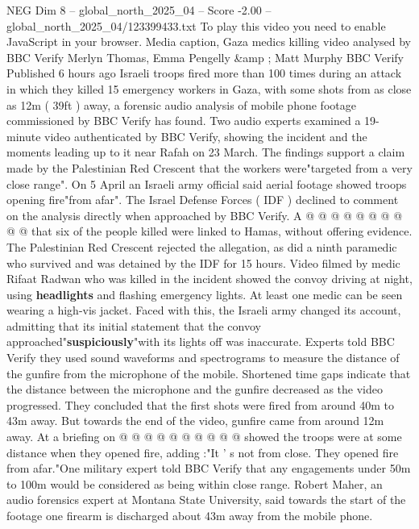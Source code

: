 \begin{textsample}{NEG Dim 8 – global\_north\_2025\_04 – Score -2.00 – global\_north\_2025\_04/123399433.txt}  \label{ex:f8_neg_086}
To play this video you need to enable JavaScript in your browser.
Media caption, Gaza medics killing video analysed by BBC Verify Merlyn Thomas, Emma Pengelly \&amp ; Matt Murphy BBC Verify Published 6 hours ago Israeli troops fired more than 100 times during an attack in which they killed 15 emergency workers in Gaza, with some shots from as close as 12m ( 39ft ) away, a forensic audio analysis of mobile phone footage commissioned by BBC Verify has found.
Two audio experts examined a 19-minute video authenticated by BBC Verify, showing the incident and the moments leading up to it near Rafah on 23 March.
The findings support a claim made by the Palestinian Red Crescent that the workers were"targeted from a very close range".
On 5 April an Israeli army official said aerial footage showed troops opening fire"from afar".
The Israel Defense Forces ( IDF ) declined to comment on the analysis directly when approached by BBC Verify.
A @ @ @ @ @ @ @ @ @ @ that six of the people killed were linked to Hamas, without offering evidence.
The Palestinian Red Crescent rejected the allegation, as did a ninth paramedic who survived and was detained by the IDF for 15 hours.
Video filmed by medic Rifaat Radwan who was killed in the incident showed the convoy driving at night, using \textbf{headlights} and flashing emergency lights.
At least one medic can be seen wearing a high-vis jacket.
Faced with this, the Israeli army changed its account, admitting that its initial statement that the convoy approached"\textbf{suspiciously}"with its lights off was inaccurate.
Experts told BBC Verify they used sound waveforms and spectrograms to measure the distance of the gunfire from the microphone of the mobile.
Shortened time gaps indicate that the distance between the microphone and the gunfire decreased as the video progressed.
They concluded that the first shots were fired from around 40m to 43m away.
But towards the end of the video, gunfire came from around 12m away.
At a briefing on @ @ @ @ @ @ @ @ @ @ showed the troops were at some distance when they opened fire, adding :"It ' s not from close.
They opened fire from afar."One military expert told BBC Verify that any engagements under 50m to 100m would be considered as being within close range.
Robert Maher, an audio forensics expert at Montana State University, said towards the start of the footage one firearm is discharged about 43m away from the mobile phone.

\end{textsample}
